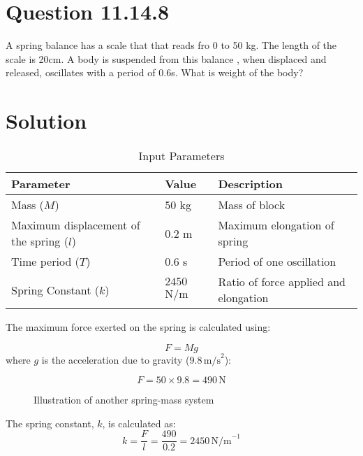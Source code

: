 \documentclass[journal,12pt,twocolumn]{IEEEtran}
\theoremstyle{remark}
\begin{document}
\section{Question 11.14.8}A spring balance has a scale that that reads fro 0 to 50 kg. The length of the scale is 20cm. A body is suspended from this balance , when displaced and released, oscillates with a period of 0.6s. What is weight of the body? 

\section{Solution}
\begin{table}[htbp]
    \centering
    \caption{Input Parameters}
    \label{tab:parameters}
    \begin{tabular}{|p{3cm}|p{1cm}|p{3cm}|}
        \hline
        \textbf{Parameter} & \textbf{Value} & \textbf{Description} \\
        \hline
        Mass ($M$) & $50$ kg & Mass of block \\
        Maximum displacement of the spring ($l$) & $0.2$ m & Maximum elongation of spring \\
        Time period ($T$) & $0.6$ s & Period of one oscillation \\
        Spring Constant ($k$) & $2450$ N/m & Ratio of force applied and elongation \\
        \hline
\end{tabular}
    
\end{table}

The maximum force exerted on the spring is calculated using:

	\begin{equation}
F = Mg
	\end{equation}
where \( g \) is the acceleration due to gravity (\( 9.8 \, \text{m/s}^2 \)):\

	\begin{equation}
F = 50 \times 9.8 = 490 \, \text{N}
	\end{equation}

\begin{figure}[!h]
    \centering
	\resizebox{0.6\columnwidth}{!}{%
	}
    \caption{Illustration of another spring-mass system}
    \label{fig:another-spring-mass-system}
\end{figure}



The spring constant, \( k \), is calculated as:
\begin{equation}
k = \frac{F}{l} = \frac{490}{0.2} = 2450 \, \text{N/m}^{-1}
\end{equation}
\end{document}
